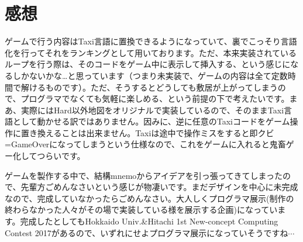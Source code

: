 \documentclass[12pt]{jsarticle}
\begin{document}
		\section{感想}

	ゲームで行う内容はTaxi言語に置換できるようになっていて、裏でこっそり言語化を行ってそれをランキングとして用いております。ただ、本来実装されているループを行う際は、そのコードをゲーム中に表示して挿入する、という感じになるしかないかな…と思っています（つまり未実装で、ゲームの内容は全て定数時間で解けるものです）。ただ、そうするとどうしても敷居が上がってしまうので、プログラマでなくても気軽に楽しめる、という前提の下で考えたいです。まあ、実際にはHard以外地図をオリジナルで実装しているので、そのままTaxi言語として動かせる訳ではありません。因みに、逆に任意のTaxiコードをゲーム操作に置き換えることは出来ません。Taxiは途中で操作ミスをすると即クビ=GameOverになってしまうという仕様なので、これをゲームに入れると鬼畜ゲー化してつらいです。
	
	ゲームを製作する中で、結構mnemoからアイデアを引っ張ってきてしまったので、先輩方ごめんなさいという感じが物凄いです。まだデザインを中心に未完成なので、完成していなかったらごめんなさい。大人しくプログラマ展示(制作の終わらなかった人々がその場で実装している様を展示する企画)になっています。完成したとしてもHokkaido Univ.\&Hitachi 1st New-concept Computing Contest 2017があるので、いずれにせよプログラマ展示になっていそうですね$\cdots$
\end{document}
